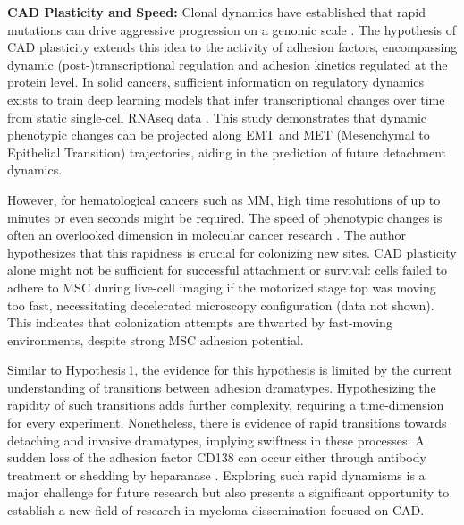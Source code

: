 \textbf{\ac{CAD} Plasticity and Speed:}
Clonal dynamics have established that rapid mutations can drive aggressive
progression on a genomic scale \cite{keatsClonalCompetitionAlternating2012,
      eversPrognosticValueExtracellular2023}. The hypothesis of \ac{CAD} plasticity
extends this idea to the activity of adhesion factors, encompassing dynamic
(post-)transcriptional regulation and adhesion kinetics regulated at the protein
level. In solid cancers, sufficient information on regulatory dynamics exists to
train deep learning models that infer transcriptional changes over time from
static single-cell RNAseq data \cite{tongLearningTranscriptionalRegulatory2023}.
This study demonstrates that dynamic phenotypic changes can be projected along
\ac{EMT} and MET (Mesenchymal to Epithelial Transition) trajectories, aiding in
the prediction of future detachment dynamics.


However, for hematological cancers such as MM, high time resolutions of up to minutes or
even seconds might be required. The speed of phenotypic changes is often an
overlooked dimension in molecular cancer research%
\cite{uthamacumaranReviewMathematicalComputational2022}. The author hypothesizes
that this rapidness is crucial for colonizing new sites. \ac{CAD} plasticity
alone might not be sufficient for successful attachment or survival: \INA cells
failed to adhere to \ac{MSC} during live-cell imaging if the motorized stage top
was moving too fast, necessitating decelerated microscopy configuration (data
not shown). This indicates that colonization attempts are thwarted by
fast-moving environments, despite strong \ac{MSC} adhesion potential.

Similar to Hypothesis\,1, the evidence for this hypothesis is limited by the
current understanding of transitions between adhesion dramatypes. Hypothesizing
the rapidity of such transitions adds further complexity, requiring a
time-dimension for every experiment. Nonetheless, there is evidence of rapid
transitions towards detaching and invasive dramatypes, implying swiftness in
these processes: A sudden loss of the adhesion factor CD138 can
occur either through antibody treatment or shedding by heparanase
\cite{yangHeparanasePromotesSpontaneous2005,
      akhmetzyanovaDynamicCD138Surface2020}. Exploring such rapid dynamisms is a major
challenge for future research but also presents a significant opportunity to
establish a new field of research in myeloma dissemination focused on \ac{CAD}.


